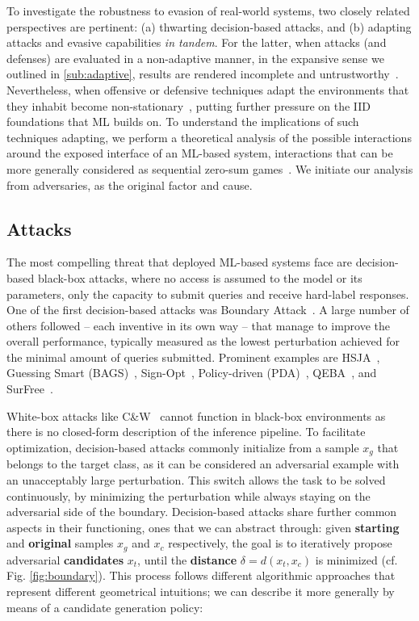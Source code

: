 \label{sec:approach}
To investigate the robustness to evasion of real-world systems, two closely related perspectives are pertinent: (a) thwarting decision-based attacks, and (b) adapting attacks and evasive capabilities \textit{in tandem}.
For the latter, when attacks (and defenses) are evaluated in a non-adaptive manner, in the expansive sense we outlined in \autoref{sub:adaptive}, results are rendered incomplete and untrustworthy~\cite{tramer2020adaptive, pintor2022indicators}.
Nevertheless, when offensive or defensive techniques adapt the environments that they inhabit become non-stationary~\cite{hernandez2017survey}, putting further pressure on the IID foundations that ML builds on.
To understand the implications of such techniques adapting, we perform a theoretical analysis of the possible interactions around the exposed interface of an ML-based system, interactions that can be more generally considered as sequential zero-sum games~\cite{littman1994markov, hardt2016strategic, bose2020adversarial}.
We initiate our analysis from adversaries, as the original factor and cause.

\subsection{Attacks}
The most compelling threat that deployed ML-based systems face are decision-based black-box attacks, where no access is assumed to the model or its parameters, only the capacity to submit queries and receive hard-label responses.
One of the first decision-based attacks was Boundary Attack~\cite{brendel2018decision}.
A large number of others followed -- each inventive in its own way -- that manage to improve the overall performance, typically measured as the lowest perturbation achieved for the minimal amount of queries submitted.
Prominent examples are HSJA~\cite{chen2020hopskipjumpattack}, Guessing Smart (BAGS)~\cite{brunner2019guessing}, Sign-Opt~\cite{cheng2019sign}, Policy-driven (PDA)~\cite{yan2020policy}, QEBA~\cite{li2020qeba}, and SurFree~\cite{maho2021surfree}.

White-box attacks like C\&W~\cite{carlini2017towards} cannot function in black-box environments as there is no closed-form description of the inference pipeline.
To facilitate optimization, decision-based attacks commonly initialize from a sample $x_g$ that belongs to the target class, as it can be considered an adversarial example with an unacceptably large perturbation.
This switch allows the task to be solved continuously, by minimizing the perturbation while always staying on the adversarial side of the boundary.
Decision-based attacks share further common aspects in their functioning, ones that we can abstract through: given \textbf{starting} and \textbf{original} samples $x_g$ and $x_c$ respectively, the goal is to iteratively propose adversarial \textbf{candidates} $x_t$, until the \textbf{distance} $\delta = d(x_t, x_c)$ is minimized (cf. Fig. \ref{fig:boundary}).
This process follows different algorithmic approaches that represent different geometrical intuitions; we can describe it more generally by means of a candidate generation policy:

